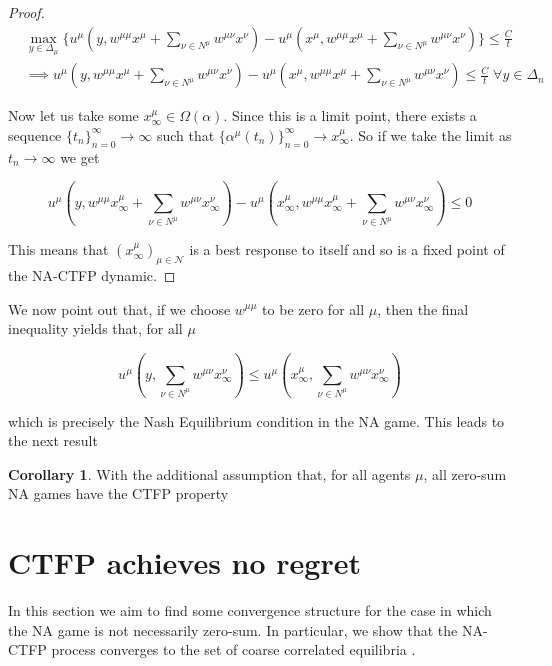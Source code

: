 \documentclass{article}
\theoremstyle{definition}
\newtheorem{corollary}{Corollary}
\newcommand{\agentset}{\mathcal{N}}
\newcommand{\wmunu}{w^{\mu \nu}}
\newcommand{\xmu}{x^{\mu}}
\newcommand{\xnu}{x^{\nu}}
\begin{document}
\begin{proof}
		\begin{align}
			& \max_{y \in \Delta_\mu} \{u^\mu(y, w^{\mu \mu} \xmu + \sum_{\nu \in N^\mu} \wmunu \xnu) - u^\mu(\xmu, w^{\mu \mu} \xmu + \sum_{\nu \in N^\mu} \wmunu \xnu) \} \leq \frac{C}{t}\\
			& \implies u^\mu(y, w^{\mu \mu} \xmu + \sum_{\nu \in N^\mu} \wmunu \xnu) - u^\mu(\xmu, w^{\mu \mu} \xmu + \sum_{\nu \in N^\mu} \wmunu \xnu) \leq \frac{C}{t} \; \forall y \in \Delta_n
		\end{align}
		
		Now let us take some $\xmu_\infty \in \Omega(\alpha)$. Since this is a limit point, there exists a sequence $\{t_n\}_{n = 0}^\infty \rightarrow \infty$ such that $\{\alpha^\mu(t_n)\}_{n = 0}^{\infty} \rightarrow \xmu_\infty$. So if we take the limit as $t_n \rightarrow \infty$ we get

		\begin{equation}
			u^\mu(y, w^{\mu \mu} \xmu_\infty + \sum_{\nu \in N^\mu} \wmunu \xnu_\infty) - u^\mu(\xmu_\infty, w^{\mu \mu} \xmu_\infty + \sum_{\nu \in N^\mu} \wmunu \xnu_\infty) \leq 0
		\end{equation}

		This means that $(\xmu_\infty)_{\mu \in \agentset}$ is a best response to itself and so is a fixed point of the NA-CTFP dynamic. 
	\end{proof}

	We now point out that, if we choose $w^{\mu \mu}$ to be zero for all $\mu$, then the final inequality yields that, for all $\mu$

	\begin{equation}
		u^\mu(y, \sum_{\nu \in N^\mu} \wmunu \xnu_\infty) \leq u^\mu(\xmu_\infty, \sum_{\nu \in N^\mu} \wmunu \xnu_\infty)
	\end{equation}

	which is precisely the Nash Equilibrium condition in the NA game. This leads to the next result

	\begin{corollary}
		With the additional assumption that, for all agents $\mu$, all zero-sum NA games have the CTFP property
	\end{corollary}

	\section{CTFP achieves no regret}
	\label{sec::CCEConvergence}

	In this section we aim to find some convergence structure for the case in which the NA game is
	not necessarily zero-sum. In particular, we  show that the NA-CTFP process converges to the set
	of coarse correlated equilibria \cite{}.
	
\end{document}
